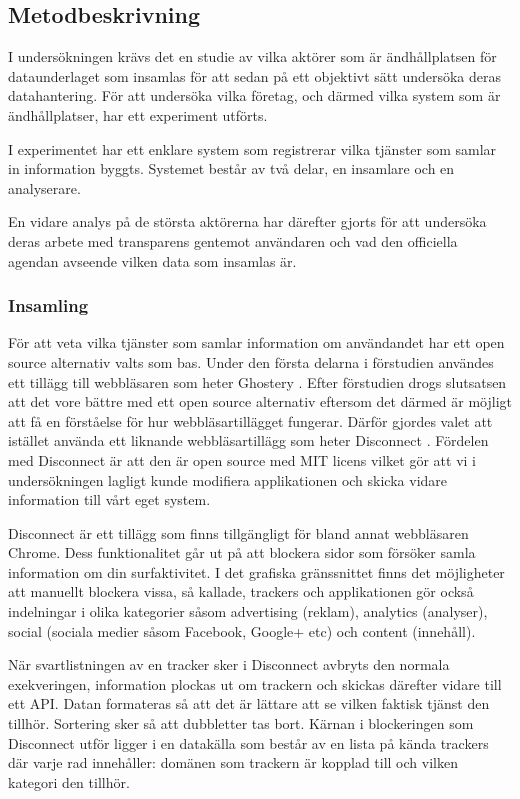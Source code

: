 \documentclass[a4paper,11pt]{article}
\begin{document}
{\subsection{Metodbeskrivning}
I undersökningen krävs det en studie av vilka aktörer som är ändhållplatsen för dataunderlaget som insamlas för att sedan på ett objektivt sätt undersöka deras datahantering. För att undersöka vilka företag, och därmed vilka system som är ändhållplatser, har ett experiment utförts.

I experimentet har ett enklare system som registrerar vilka tjänster som samlar in information byggts. Systemet består av två delar, en insamlare och  en analyserare. 

En vidare analys på de största aktörerna har därefter gjorts för att undersöka deras arbete med transparens gentemot användaren och vad den officiella agendan avseende vilken data som insamlas är. 

\subsubsection{Insamling}
För att veta vilka tjänster som samlar information om användandet har ett open source alternativ valts som bas. Under den första delarna i förstudien användes ett tillägg till webbläsaren som heter Ghostery \cite{Ghostery}. Efter förstudien drogs slutsatsen att det vore bättre med ett open source alternativ eftersom det därmed är möjligt att få en förståelse för hur webbläsartillägget fungerar. Därför gjordes valet att istället använda ett liknande webbläsartillägg som heter Disconnect \cite{Disconnect}. Fördelen med Disconnect är att den är open source med MIT \cite{MIT} licens vilket gör att vi i undersökningen lagligt kunde modifiera applikationen och skicka vidare information till vårt eget system. 

Disconnect är ett tillägg som finns tillgängligt för bland annat webbläsaren Chrome. Dess funktionalitet går ut på att blockera sidor som försöker samla information om din surfaktivitet. I det grafiska gränssnittet finns det möjligheter att manuellt blockera vissa, så kallade, trackers och applikationen gör också indelningar i olika kategorier såsom advertising (reklam), analytics (analyser), social (sociala medier såsom Facebook, Google+ etc) och content (innehåll). 

När svartlistningen av en tracker sker i Disconnect avbryts den normala exekveringen, information plockas ut om trackern och skickas därefter vidare till ett API. Datan formateras så att det är lättare att se vilken faktisk tjänst den tillhör. Sortering sker så att dubbletter tas bort. Kärnan i blockeringen som Disconnect utför ligger i en datakälla som består av en lista på kända trackers där varje rad innehåller: domänen som trackern är kopplad till och vilken kategori den tillhör. 

}
\end{document}

